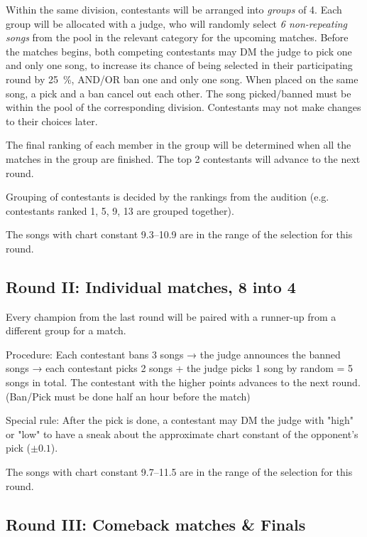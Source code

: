 \documentclass{article}
\newcommand{\alert}[1]{{\color{red} #1}}
\newcommand{\srbgcolor}{red!40}
\newcommand{\specialrule}[1]{\colorbox{\srbgcolor}{\parbox{\textwidth}{#1}}}
\begin{document}
Within the same division,
contestants will be arranged into \emph{groups} of 4.
Each group will be allocated with a judge,
who will randomly select \emph{6 non-repeating songs}
from the pool in the relevant category
for the upcoming matches.
Before the matches begins,
both competing contestants
may DM the judge to pick one and only one song,
to increase its chance of being selected
in their participating round by \qty{25}{\percent},
AND/OR ban one and only one song.
When placed on the same song,
a pick and a ban cancel out each other.
The song picked/banned must be within
the pool of the corresponding division.
Contestants may not make changes to their choices later.

The final ranking of each member in the group will be determined  %
when all the matches in the group are finished.
The top 2 contestants will advance to the next round.

Grouping of contestants is decided
by the rankings from the audition
(e.g. contestants ranked 1, 5, 9, 13
are grouped together).

\alert{
	The songs with chart constant 9.3--10.9
	are in the range of the selection for this round.
}

\subsection  {Round II: Individual matches, 8 into 4}

Every champion  %
from the last round
will be paired with a runner-up
from a different group for a match.

Procedure: Each contestant bans 3 songs →
the judge announces the banned songs →
each contestant picks 2 songs + the judge picks 1 song by random = 5 songs in total.
The contestant with the higher points advances to the next round.
(Ban/Pick must be done half an hour before the match)

\specialrule{
	Special rule: After the pick is done,
	a contestant may DM the judge with "high" or "low"
	to have a sneak about
	the approximate chart constant of the opponent's pick
	($\pm0.1$).
}

\nopagebreak

\alert{
	The songs with chart constant 9.7--11.5
	are in the range of the selection for this round.
}

\subsection{Round III: Comeback %
	matches \& Finals}
\end{document}
